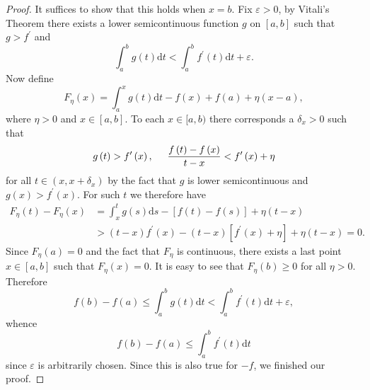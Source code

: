 \begin{proof}
It suffices to show that this holds when $x=b$. Fix $\varepsilon>0$, by Vitali's Theorem there exists a lower semicontinuous function $g$ on $[a,b]$ such that $g>f^\prime$ and 
$$
\int_a^b{g\left( t \right) \mathrm{d}t}<\int_a^b{f^{\prime}\left( t \right) \mathrm{d}t}+\varepsilon .
$$
Now define 
$$
F_{\eta}\left( x \right) =\int_a^x{g\left( t \right) \mathrm{d}t}-f\left( x \right) +f\left( a \right) +\eta \left( x-a \right) ,
$$
where $\eta>0$ and $x\in [a,b]$. To each $x\in [a,b)$ there corresponds a $\delta_x>0$ such that 
$$
g\left( t \right) >f^{\prime}\left( x \right) ,\hspace{0.5cm}\frac{f\left( t \right) -f\left( x \right)}{t-x}<f^{\prime}\left( x \right) +\eta 
$$
for all $t\in (x,x+\delta_x)$ by the fact that $g$ is lower semicontinuous and $g(x)>f^\prime(x)$. For such $t$ we therefore have 
$$
\begin{aligned}
F_{\eta}\left( t \right) -F_{\eta}\left( x \right) &=\int_x^t{g\left( s \right) \mathrm{d}s}-\left[ f\left( t \right) -f\left( s \right) \right] +\eta \left( t-x \right) 
\\
&>\left( t-x \right) f^{\prime}\left( x \right) -\left( t-x \right) \left[ f^{\prime}\left( x \right) +\eta \right] +\eta \left( t-x \right) =0.
\end{aligned}
$$
Since $F_\eta(a)=0$ and the fact that $F_\eta$ is continuous, there exists a last point $x\in [a,b]$ such that $F_\eta(x)=0$. It is easy to see that $F_\eta(b)\ge 0$ for all $\eta>0$. Therefore 
$$
f\left( b \right) -f\left( a \right) \le \int_a^b{g\left( t \right) \mathrm{d}t}<\int_a^b{f^{\prime}\left( t \right) \mathrm{d}t}+\varepsilon ,
$$
whence 
$$
f\left( b \right) -f\left( a \right) \le \int_a^b{f^{\prime}\left( t \right) \mathrm{d}t}
$$
since $\varepsilon$ is arbitrarily chosen. Since this is also true for $-f$, we finished our proof.
\end{proof}
